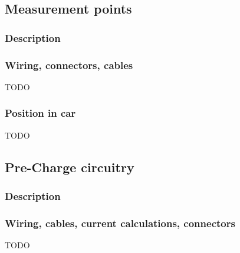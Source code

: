 \documentclass{article}
\begin{document}
\subsection{Measurement points}\label{measurement_points}
\subsubsection{Description}

\subsubsection{Wiring, connectors, cables}
TODO

\subsubsection{Position in car}
TODO

\subsection{Pre-Charge circuitry}\label{pre_charge_circuitry}
\subsubsection{Description}

\subsubsection{Wiring, cables, current calculations, connectors}
TODO
\end{document}
